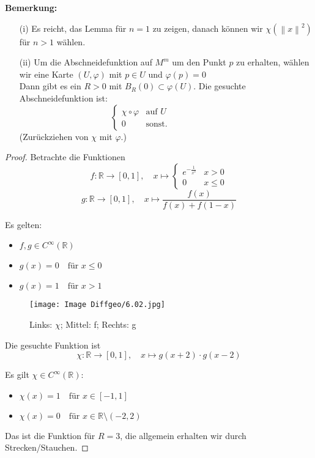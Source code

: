 \documentclass[fleqn, 12pt, letterpaper]{article}
\newcommand{\txt}[1]{\text{#1}}
\newcommand\norm[1]{\left\lVert#1\right\rVert}
\begin{document}
\textbf{Bemerkung:}
\begin{itemize}
  \item[(i)] Es reicht, das Lemma für \( n = 1 \) zu zeigen, danach können wir $\chi(\norm{x}^2)$ für \( n > 1 \) wählen.
  
  \item[(ii)] Um die Abschneidefunktion auf \( M^m \) um den Punkt \( p \) zu erhalten, wählen wir eine Karte \( (U, \varphi) \) mit \( p \in U \) und $\varphi(p)=0$ \\
  Dann gibt es ein \( R > 0 \) mit $B_R(0)\subset \varphi(U)$. Die gesuchte Abschneidefunktion ist:
\[
\quad
\begin{cases}
\chi \circ \varphi & \txt{auf } U \\
0 & \txt{sonst.} \quad \qquad \qquad \qquad 
\end{cases}
\]
(Zurückziehen von $\chi$ mit $\varphi$.)
\end{itemize}

\begin{proof}
    Betrachte die Funktionen
\[
f \colon \mathbb{R} \longrightarrow [0,1], \quad
x \mapsto
\begin{cases}
e^{-\frac{1}{x^2}} & x > 0 \\
0 & x \leq 0
\end{cases}
\]
\[
g \colon \mathbb{R} \longrightarrow [0,1], \quad x \mapsto \frac{f(x)}{f(x)+f(1-x)}
\]

\medskip

Es gelten: 
\begin{itemize}
  \item \( f, g \in C^\infty(\mathbb{R}) \)
  \item \( g(x) = 0 \quad \text{für } x \leq 0 \)
  \item \( g(x) = 1 \quad \text{für } x > 1 \)
\end{itemize}

\begin{figure}[H]
  \centering
  \texttt{[image: Image Diffgeo/6.02.jpg]}
\caption{Links: $\chi$; Mittel: f; Rechts: g}
\end{figure}
Die gesuchte Funktion ist
\[
\chi \colon \mathbb{R} \longrightarrow [0,1], \quad
x \mapsto g\left( x+2 \right) \cdot g\left( x-2 \right)
\]

\medskip

Es gilt \( \chi \in C^\infty(\mathbb{R}) \):
\begin{itemize}
  \item \( \chi(x) = 1 \quad \text{für } x \in [-1,1] \)
  \item \( \chi(x) = 0 \quad \text{für } x \in \mathbb{R} \setminus (-2,2) \)
\end{itemize}

\medskip

Das ist die Funktion für \( R = 3 \), die allgemein erhalten wir durch Strecken/Stauchen.
\end{proof}
\end{document}

